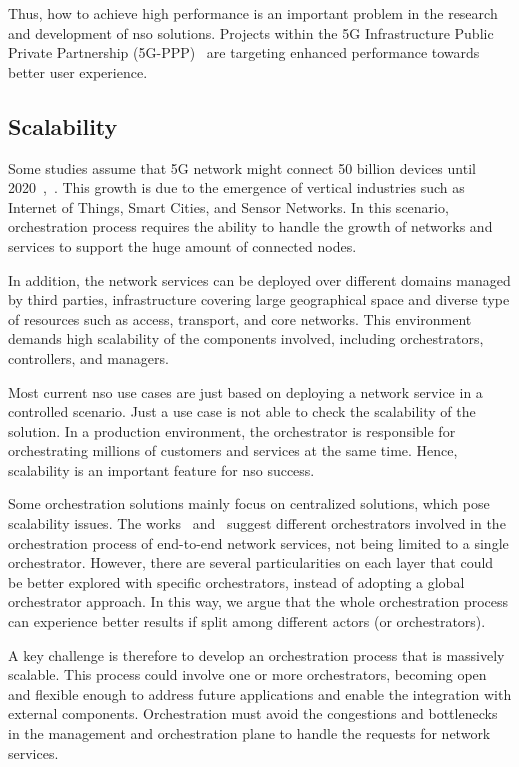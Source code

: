 Thus, how to achieve high performance is an important problem in the research and development of \gls{nso} solutions. Projects within the 5G Infrastructure Public Private Partnership (5G-PPP)~\cite{elayoubi:hal-01488208} are targeting enhanced performance towards better user experience. 

\subsection{Scalability}

Some studies assume that 5G network might connect 50 billion devices until 2020~\cite{Panwar2016ACommunication},~\cite{Evans2011TheEverything}. This growth is due to the emergence of vertical industries such as Internet of Things, Smart Cities, and Sensor Networks. In this scenario, orchestration process requires the ability to handle the growth of networks and services to support the huge amount of connected nodes.

In addition, the network services can be deployed over different domains managed by third parties, infrastructure covering large geographical space and diverse type of resources such as access, transport, and core networks. This environment demands high scalability of the components involved, including orchestrators, controllers, and managers. 

Most current \gls{nso} use cases are just based on deploying a network service in a controlled scenario. Just a use case is not able to check the scalability of the solution. In a production environment, the orchestrator is responsible for orchestrating millions of customers and services at the same time. Hence, scalability is an important feature for \gls{nso} success.

Some orchestration solutions mainly focus on centralized solutions, which pose scalability issues. The works~\cite{Alvizu2016AdvanceEra} and~\cite{Garay2016ServiceForward} suggest different orchestrators involved in the orchestration process of end-to-end network services, not being limited to a single orchestrator. However, there are several particularities on each layer that could be better explored with specific orchestrators, instead of adopting a global orchestrator approach. In this way, we argue that the whole orchestration process can experience better results if split among different actors (or orchestrators). 

A key challenge is therefore to develop an orchestration process that is massively scalable. This process could involve one or more orchestrators, becoming open and flexible enough to address future applications and enable the integration with external components. Orchestration must avoid the congestions and bottlenecks in the management and orchestration plane to handle the requests for network services.
  
